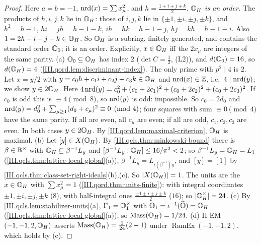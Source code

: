 \begin{example}
\end{example}
\begin{proof}
Here $a=b=-1$, $\operatorname{nrd}(x)=\sum x_\mu^2$, and $h=\frac{1+i+j+k}2$.
\emph{$\mathbb{O}_H$ is an order.} The products of $h,i,j,k$ lie in $\mathbb{O}_H$: those of $i,j,k$ lie in $\{\pm1,\pm i,\pm j,\pm k\}$, and
$h^2=h-1$, $hi=jh=h-1-k$, $ih=hk=h-1-j$, $hj=kh=h-1-i$. Also $1=2h-i-j-k\in\mathbb{O}_H$. So $\mathbb{O}_H$ is a subring, finitely generated, and contains the
standard order $\mathbb{O}_0$; it is an order. Explicitly, $x\in\mathbb{O}_H$ iff the $2x_\mu$ are integers of the same parity.
(a) $\mathbb{O}_0\subseteq\mathbb{O}_H$ has index $2$ ($\det C=\frac12$, (L2)), and $d(\mathbb{O}_0)=16$, so $d(\mathbb{O}_H)=4$ (\cref{III.qord.lem:discriminant-index}). The only
prime with $p^2\mid4$ is $2$. Let $x=y/2$ with $y=c_0h+c_1i+c_2j+c_3k\in\mathbb{O}_H$ and $\operatorname{nrd}(x)\in\mathbb{Z}$, i.e.\ $4\mid\operatorname{nrd}(y)$; we show $y\in2\mathbb{O}_H$. Here
$4\operatorname{nrd}(y)=c_0^2+(c_0+2c_1)^2+(c_0+2c_2)^2+(c_0+2c_3)^2$. If $c_0$ is odd this is $\equiv4\pmod8$, so $\operatorname{nrd}(y)$ is odd: impossible. So $c_0=2d_0$ and
$\operatorname{nrd}(y)=d_0^2+\sum_{\mu\ge1}(d_0+c_\mu)^2\equiv0\pmod4$; four squares with sum $\equiv0\pmod 4$ have the same parity. If all are even, all $c_\mu$
are even; if all are odd, $c_1,c_2,c_3$ are even. In both cases $y\in2\mathbb{O}_H$. By \cref{III.qord.lem:maximal-criterion}, $\mathbb{O}_H$ is maximal.
(b) Let $[y]\in X(\mathbb{O}_H)$. By \cref{III.qcls.thm:minkowski-bound} there is $\beta\in\mathbb{B}^\times$ with $\mathbb{O}_H\subseteq\beta^{-1}L_y$ and
$[\beta^{-1}L_y:\mathbb{O}_H]\le16/\pi^2<2$; so $\beta^{-1}L_y=\mathbb{O}_H=L_1$ (\cref{III.qcls.thm:lattice-local-global}(a)), $\beta^{-1}L_y=L_{\iota(\beta^{-1})y}$, and
$[y]=[1]$ by \cref{III.qcls.thm:class-set-right-ideals}(b),(c). So $\lvert X(\mathbb{O}_H)\rvert=1$. The units are the $x\in\mathbb{O}_H$ with $\sum x_\mu^2=1$
(\cref{III.qord.thm:units-finite}): with integral coordinates $\pm1,\pm i,\pm j,\pm k$ ($8$), with half-integral ones $\frac{\pm1\pm i\pm j\pm k}2$ ($16$); so
$\lvert\mathbb{O}_H^\times\rvert=24$.
(c) By \cref{III.qcls.lem:stabilizer-units}(a), $\Gamma_1=\mathbb{O}_1^\times$ with $\mathbb{O}_1=\iota^{-1}(\widehat{\mathbb{O}})=\mathbb{O}_H$ (\cref{III.qcls.thm:lattice-local-global}(a)), so
$\operatorname{Mass}(\mathbb{O}_H)=1/24$.
(d) H-EM$(-1,-1,2,\mathbb{O}_H)$ asserts $\operatorname{Mass}(\mathbb{O}_H)=\frac1{24}(2-1)$ under $\operatorname{RamEx}(-1,-1,2)$, which holds by (c).
\end{proof}


